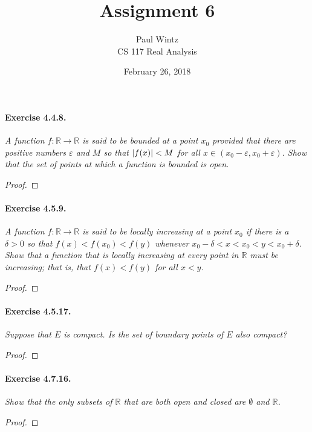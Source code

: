 \documentclass[11pt]{article}
\title{Assignment 6}
\author{Paul Wintz\\CS 117 Real Analysis}
\date{February 26, 2018}
\DeclarePairedDelimiter{\abs}{\lvert}{\rvert}
\begin{document}
\maketitle


\paragraph{Exercise 4.4.8.} \textit{A function $f: \mathbb{R} \rightarrow \mathbb{R}$ is said to be \textit{bounded at a point $x_0$} provided that there are positive numbers $\varepsilon$ and $M$ so that $\abs{f(x)} < M$ for all $x \in (x_0-\varepsilon, x_0+\varepsilon)$. 
Show that the set of points at which a function is bounded is open.}

\begin{proof}
\end{proof}

\paragraph{Exercise 4.5.9.} \textit{A function $f: \mathbb{R} \rightarrow \mathbb{R}$ is said to be \textit{locally increasing} at a point $x_0$ if there is a $\delta > 0$ so that $f(x) < f(x_0) < f(y)$ whenever $x_0-\delta < x < x_0 < y < x_0+\delta.$ Show that a function that is locally increasing at every point in $\mathbb{R}$ must be increasing; that is, that $f(x) < f(y)$ for all $x < y$.}

\begin{proof}
\end{proof}

\paragraph{Exercise 4.5.17.} \textit{Suppose that $E$ is compact. Is the set of boundary points of $E$ also compact?}

\begin{proof}
\end{proof}

\paragraph{Exercise 4.7.16.} \textit{Show that the only subsets of $\mathbb{R}$ that are both open and closed are $\emptyset$ and $\mathbb{R}$.}

\begin{proof}
\end{proof}
\end{document}

